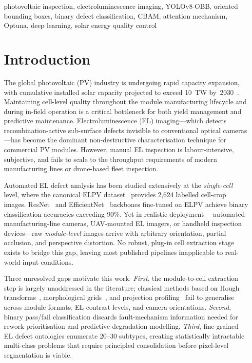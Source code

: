 \documentclass[conference]{IEEEtran}
\begin{document}
\begin{IEEEkeywords}
photovoltaic inspection, electroluminescence imaging,
YOLOv8-OBB, oriented bounding boxes, binary defect
classification, CBAM, attention mechanism, Optuna,
deep learning, solar energy quality control
\end{IEEEkeywords}

\section{Introduction}

The global photovoltaic (PV) industry is undergoing rapid
capacity expansion, with cumulative installed solar capacity
projected to exceed 10~TW by~2030~\cite{iea2023}.
Maintaining cell-level quality throughout the module
manufacturing lifecycle and during in-field operation is a
critical bottleneck for both yield management and predictive
maintenance. Electroluminescence (EL) imaging---which detects
recombination-active sub-surface defects invisible to
conventional optical cameras---has become the dominant
non-destructive characterisation technique for commercial PV
modules. However, manual EL inspection is labour-intensive,
subjective, and fails to scale to the throughput requirements
of modern manufacturing lines or drone-based fleet inspection.

Automated EL defect analysis has been studied extensively at
the \textit{single-cell} level, where the canonical ELPV
dataset~\cite{deitsch2019} provides 2{,}624 labelled cell-crop
images. ResNet~\cite{he2016} and EfficientNet~\cite{tan2019}
backbones fine-tuned on ELPV achieve binary classification
accuracies exceeding 90\%. Yet in realistic deployment---
automated manufacturing-line cameras, UAV-mounted EL imagers,
or handheld inspection devices---raw \textit{module-level}
images arrive with arbitrary orientation, partial occlusion,
and perspective distortion. No robust, plug-in cell extraction
stage exists to bridge this gap, leaving most published
pipelines inapplicable to real-world input conditions.

Three unresolved gaps motivate this work.
\textit{First}, the module-to-cell extraction step is largely
unaddressed in the literature; classical methods based on
Hough transforms~\cite{duda1972}, morphological
grids~\cite{soille2003}, and projection
profiling~\cite{wong1982} fail to generalise across module
formats, EL contrast levels, and camera orientations.
\textit{Second}, binary pass/fail classification discards
fault-mechanism information needed for rework prioritisation
and predictive degradation modelling.
\textit{Third}, fine-grained EL defect ontologies enumerate
20--30 subtypes, creating statistically intractable
multi-class problems that require principled consolidation
before pixel-level segmentation is viable.
\end{document}
